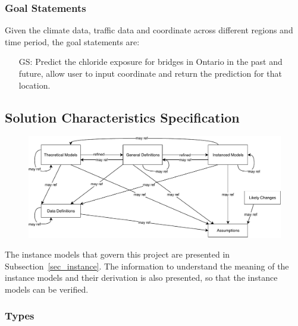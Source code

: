 \documentclass[12pt]{article}
\newcounter{goalnum} %
\begin{document}

\newpage
\subsubsection{Goal Statements}

\noindent Given the climate data, traffic data and coordinate across different regions and time period, the goal statements are:

\begin{itemize}

\item[GS\refstepcounter{goalnum}\thegoalnum \label{G_ChlorideExposurePrediction}:] Predict the chloride exposure for bridges in Ontario in the past and future, allow user to input coordinate and return the prediction for that location.

\end{itemize}

\subsection{Solution Characteristics Specification}

\begin{figure}[H]
  \includegraphics[scale=0.9]{RelationsBetweenTM_GD_IM_DD_A.pdf}
\end{figure}

The instance models that govern this project are presented in
Subsection~\ref{sec_instance}.  The information to understand the meaning of the
instance models and their derivation is also presented, so that the instance
models can be verified.

\subsubsection{Types}
\end{document}
